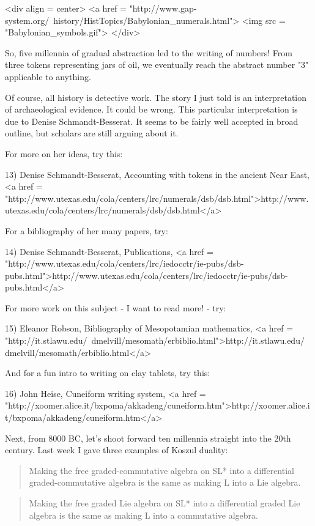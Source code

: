 <div align = center>
<a href = "http://www.gap-system.org/~history/HistTopics/Babylonian_numerals.html">
<img src = "Babylonian_symbols.gif">
</div>


So, five millennia of gradual abstraction led to the writing of numbers!
From three tokens representing jars of oil, we eventually reach the 
abstract number "3" applicable to anything.  

Of course, all history is detective work.  The story I just told is 
an interpretation of archaeological evidence.  It could be wrong.  
This particular interpretation is due to Denise Schmandt-Besserat.  
It seems to be fairly well accepted in broad outline, but scholars 
are still arguing about it.  

For more on her ideas, try this:

13) Denise Schmandt-Besserat, Accounting with tokens in the 
ancient Near East, 
<a href = "http://www.utexas.edu/cola/centers/lrc/numerals/dsb/dsb.html">http://www.utexas.edu/cola/centers/lrc/numerals/dsb/dsb.html</a>

For a bibliography of her many papers, try:

14) Denise Schmandt-Besserat, Publications,
<a href = "http://www.utexas.edu/cola/centers/lrc/iedocctr/ie-pubs/dsb-pubs.html">http://www.utexas.edu/cola/centers/lrc/iedocctr/ie-pubs/dsb-pubs.html</a>

For more work on this subject - I want to read more! - try:

15) Eleanor Robson, Bibliography of Mesopotamian mathematics,
<a href = "http://it.stlawu.edu/~dmelvill/mesomath/erbiblio.html">http://it.stlawu.edu/~dmelvill/mesomath/erbiblio.html</a>

And for a fun intro to writing on clay tablets, try this:

16) John Heise, Cuneiform writing system,
<a href = "http://xoomer.alice.it/bxpoma/akkadeng/cuneiform.htm">http://xoomer.alice.it/bxpoma/akkadeng/cuneiform.htm</a>

Next, from 8000 BC, let's shoot forward ten millennia straight into the 20th
century.  Last week I gave three examples of Koszul duality:

\begin{quote}
 Making the free graded-commutative algebra on SL* into a differential
 graded-commutative algebra is the same as making L into a Lie algebra.
\end{quote}

\begin{quote}
 Making the free graded Lie algebra on SL* into a differential
 graded Lie algebra is the same as making L into a commutative algebra.
\end{quote}

